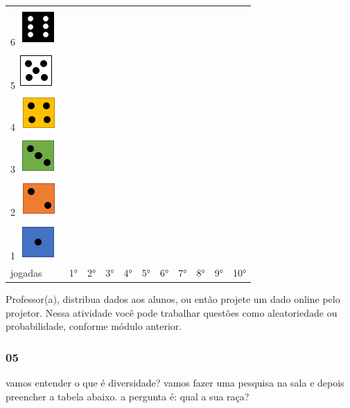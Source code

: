\begin{longtable}[]{@{}lllllllllll@{}}
\toprule
6 \includegraphics[width=0.56258in,height=0.57300in]{media/image98.png}
& & & & & & & & & &\tabularnewline
5 \includegraphics[width=0.53132in,height=0.55216in]{media/image99.png}
& & & & & & & & & &\tabularnewline
4 \includegraphics[width=0.61467in,height=0.53132in]{media/image100.png}
& & & & & & & & & &\tabularnewline
3 \includegraphics[width=0.56258in,height=0.53132in]{media/image101.png}
& & & & & & & & & &\tabularnewline
2 \includegraphics[width=0.57300in,height=0.54174in]{media/image102.png}
& & & & & & & & & &\tabularnewline
1 \includegraphics[width=0.58341in,height=0.55216in]{media/image103.png}
& & & & & & & & & &\tabularnewline
jogadas & 1° & 2° & 3° & 4° & 5° & 6° & 7° & 8° & 9° &
10°\tabularnewline
\bottomrule
\end{longtable}

Professor(a), distribua dados aos alunos, ou então projete um dado
online pelo projetor. Nessa atividade você pode trabalhar questões como
aleatoriedade ou probabilidade, conforme módulo anterior.

\subsubsection{05}\label{section-80}

vamos entender o que é diversidade? vamos fazer uma pesquisa na sala e
depois preencher a tabela abaixo. a pergunta é: qual a sua raça?

